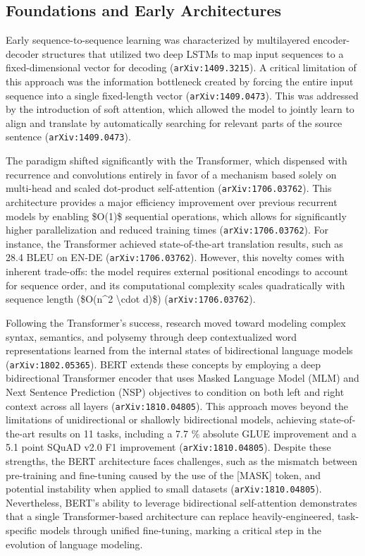 \documentclass[11pt]{article}
\begin{document}
\subsection{Foundations and Early Architectures}

Early sequence-to-sequence learning was characterized by multilayered encoder-decoder structures that utilized two deep LSTMs to map input sequences to a fixed-dimensional vector for decoding (\texttt{arXiv:1409.3215}). A critical limitation of this approach was the information bottleneck created by forcing the entire input sequence into a single fixed-length vector (\texttt{arXiv:1409.0473}). This was addressed by the introduction of soft attention, which allowed the model to jointly learn to align and translate by automatically searching for relevant parts of the source sentence (\texttt{arXiv:1409.0473}).

The paradigm shifted significantly with the Transformer, which dispensed with recurrence and convolutions entirely in favor of a mechanism based solely on multi-head and scaled dot-product self-attention (\texttt{arXiv:1706.03762}). This architecture provides a major efficiency improvement over previous recurrent models by enabling \$O(1)\$ sequential operations, which allows for significantly higher parallelization and reduced training times (\texttt{arXiv:1706.03762}). For instance, the Transformer achieved state-of-the-art translation results, such as 28.4 BLEU on EN-DE (\texttt{arXiv:1706.03762}). However, this novelty comes with inherent trade-offs: the model requires external positional encodings to account for sequence order, and its computational complexity scales quadratically with sequence length (\$O(n\textasciicircum{}2 \textbackslash{}cdot d)\$) (\texttt{arXiv:1706.03762}).

Following the Transformer's success, research moved toward modeling complex syntax, semantics, and polysemy through deep contextualized word representations learned from the internal states of bidirectional language models (\texttt{arXiv:1802.05365}). BERT extends these concepts by employing a deep bidirectional Transformer encoder that uses Masked Language Model (MLM) and Next Sentence Prediction (NSP) objectives to condition on both left and right context across all layers (\texttt{arXiv:1810.04805}). This approach moves beyond the limitations of unidirectional or shallowly bidirectional models, achieving state-of-the-art results on 11 tasks, including a 7.7 \% absolute GLUE improvement and a 5.1 point SQuAD v2.0 F1 improvement (\texttt{arXiv:1810.04805}). Despite these strengths, the BERT architecture faces challenges, such as the mismatch between pre-training and fine-tuning caused by the use of the [MASK] token, and potential instability when applied to small datasets (\texttt{arXiv:1810.04805}). Nevertheless, BERT's ability to leverage bidirectional self-attention demonstrates that a single Transformer-based architecture can replace heavily-engineered, task-specific models through unified fine-tuning, marking a critical step in the evolution of language modeling.
\end{document}
